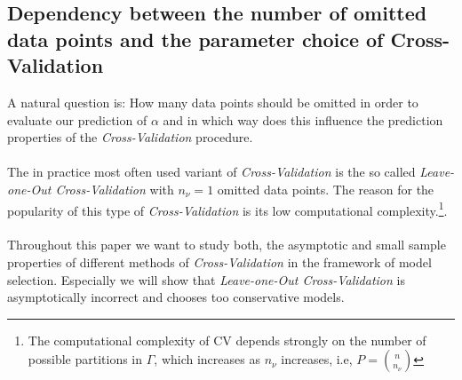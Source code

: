 \documentclass[Research_Module_ES.tex]{subfiles}
\begin{document}
\subsection{Dependency between the number of omitted data points and the  parameter choice of Cross-Validation}
A natural question is: How many data points should be omitted in order to evaluate our prediction of $\alpha$ and in which way does this influence the prediction properties of the \textit{Cross-Validation} procedure.\\
\\
The in practice most often used variant of \textit{Cross-Validation} is the so called \textit{ Leave-one-Out Cross-Validation} with $n_\nu=1$ omitted data points. The reason for the popularity of this type of \textit{Cross-Validation} is its low computational complexity.\footnote{The computational complexity of CV depends strongly on the number of possible partitions in $\Gamma$, which increases as $n_\nu$ increases, i.e,
$P=\binom{n}{n_\nu}$}.\\
\\
Throughout this paper we want to study both, the asymptotic and small sample properties of different methods of \textit{Cross-Validation} in the framework of model selection. Especially we will show that \textit{ Leave-one-Out Cross-Validation} is asymptotically incorrect and chooses too conservative models.
\end{document}
